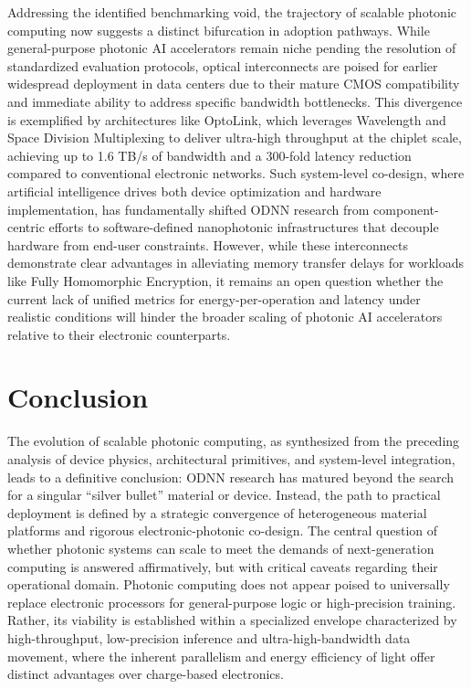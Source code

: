 Addressing the identified benchmarking void, the trajectory of scalable photonic computing now suggests a distinct bifurcation in adoption pathways. While general-purpose photonic AI accelerators remain niche pending the resolution of standardized evaluation protocols, optical interconnects are poised for earlier widespread deployment in data centers due to their mature CMOS compatibility and immediate ability to address specific bandwidth bottlenecks. This divergence is exemplified by architectures like OptoLink, which leverages Wavelength and Space Division Multiplexing to deliver ultra-high throughput at the chiplet scale, achieving up to 1.6 TB/s of bandwidth and a 300-fold latency reduction compared to conventional electronic networks. Such system-level co-design, where artificial intelligence drives both device optimization and hardware implementation, has fundamentally shifted ODNN research from component-centric efforts to software-defined nanophotonic infrastructures that decouple hardware from end-user constraints. However, while these interconnects demonstrate clear advantages in alleviating memory transfer delays for workloads like Fully Homomorphic Encryption, it remains an open question whether the current lack of unified metrics for energy-per-operation and latency under realistic conditions will hinder the broader scaling of photonic AI accelerators relative to their electronic counterparts. \citep{doi_10_1145_3806395_315ab915} \citep{doi_10_1016_j_pquantelec_2023_100469_e4974ca6}

\section{Conclusion}\label{conclusion}

The evolution of scalable photonic computing, as synthesized from the preceding analysis of device physics, architectural primitives, and system-level integration, leads to a definitive conclusion: ODNN research has matured beyond the search for a singular ``silver bullet'' material or device. Instead, the path to practical deployment is defined by a strategic convergence of heterogeneous material platforms and rigorous electronic-photonic co-design. The central question of whether photonic systems can scale to meet the demands of next-generation computing is answered affirmatively, but with critical caveats regarding their operational domain. Photonic computing does not appear poised to universally replace electronic processors for general-purpose logic or high-precision training. Rather, its viability is established within a specialized envelope characterized by high-throughput, low-precision inference and ultra-high-bandwidth data movement, where the inherent parallelism and energy efficiency of light offer distinct advantages over charge-based electronics.

